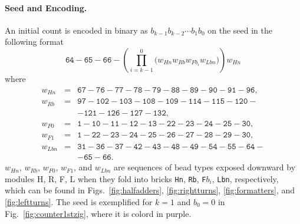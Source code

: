 \documentclass[twocolumn]{svjour3}
\begin{document}
\paragraph{Seed and Encoding.}
An initial count is encoded in binary as $b_{k-1}b_{k-2} \cdots b_1b_0$ on the seed in the following format
\begin{equation} \label{eq:zagencoding}
\texttt{64}{-}\texttt{65}{-}\texttt{66}{-}\left( \prod^0_{i = k-1} \bigl(  w_{Hn} w_{Rb} w_{Fb_i} w_{Lbn} \bigr) \right) w_{Hn}
\end{equation}
where 
\begin{eqnarray*}
w_{Hn} &=& \texttt{67}{-}\texttt{76}{-}\texttt{77}{-}\texttt{78}{-}\texttt{79}{-}\texttt{88}{-}\texttt{89}{-}\texttt{90}{-}\texttt{91}{-}\texttt{96},\\
w_{Rb} &=& \texttt{97}{-}\texttt{102}{-}\texttt{103}{-}\texttt{108}{-}\texttt{109}{-}\texttt{114}{-}\texttt{115}{-}\texttt{120}{-} \\
& & {-}\texttt{121}{-}\texttt{126}{-}\texttt{127}{-}\texttt{132},\\
w_{F0} &=& \texttt{1}{-}\texttt{10}{-}\texttt{11}{-}\texttt{12}{-}\texttt{13}{-}\texttt{22}{-}\texttt{23}{-}\texttt{24}{-}\texttt{25}{-}\texttt{30},\\
w_{F1} &=& \texttt{1}{-}\texttt{22}{-}\texttt{23}{-}\texttt{24}{-}\texttt{25}{-}\texttt{26}{-}\texttt{27}{-}\texttt{28}{-}\texttt{29}{-}\texttt{30},\\
 w_{Lbn} &=& \texttt{31}{-}\texttt{36}{-}\texttt{37}{-}\texttt{42}{-}\texttt{43}{-}\texttt{48}{-}\texttt{49}{-}\texttt{54}{-}\texttt{55}{-}\texttt{64}{-}\\
& & {-}\texttt{65}{-}\texttt{66}.
\end{eqnarray*}
$w_{Hn}$, $w_{Rb}$, $w_{F0}$, $w_{F1}$, and $w_{Lbn}$ are sequences of bead types exposed downward by modules H, R, F, L when they fold into bricks \texttt{Hn}, \texttt{Rb}, \texttt{F}$b_i$, \texttt{Lbn}, respectively, which can be found in Figs.~\ref{fig:halfadders}, \ref{fig:rightturns}, \ref{fig:formatters}, and \ref{fig:leftturns}.
The seed is exemplified for $k = 1$ and $b_0 = 0$ in Fig.~\ref{fig:counter1stzig}, where it is colord in purple.
\end{document}
